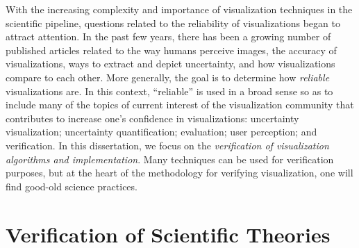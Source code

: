With the increasing complexity and importance of visualization techniques in the scientific pipeline, questions related to the reliability of visualizations began to attract attention. In the past few years, there has been a growing number of published  articles related to the way humans perceive images, the accuracy of visualizations, ways to extract and depict uncertainty, and how visualizations compare to each other. More generally, the goal is to determine how \emph{reliable} visualizations are.
%
In this context, ``reliable'' is used in a broad sense so as to include many of the topics of current interest of the visualization community that contributes to increase one's confidence in visualizations: uncertainty visualization; uncertainty quantification; evaluation; user perception; and verification.
%
In this dissertation, we focus on the \emph{verification of visualization algorithms and implementation}.  
%
%
%
Many techniques can be used for verification purposes, but at the heart of the methodology for verifying visualization, one will find good-old science practices. 
%
	
\section{Verification of Scientific Theories}

